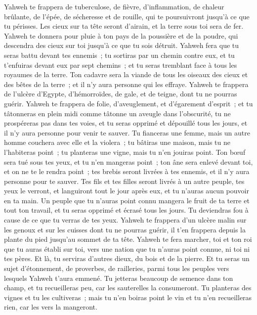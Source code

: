 \begin{multicols}{2}
Yahweh te frappera de tuberculose, de fièvre, d'inflammation, de chaleur brûlante, de l'épée, de sécheresse et de rouille, qui te poursuivront jusqu'à ce que tu périsses.
Les cieux sur ta tête seront d'airain, et la terre sous toi sera de fer.
Yahweh te donnera pour pluie à ton pays de la poussière et de la poudre, qui descendra des cieux sur toi jusqu'à ce que tu sois détruit.
Yahweh fera que tu seras battu devant tes ennemis~; tu sortiras par un chemin contre eux, et tu t'enfuiras devant eux par sept chemins~; et tu seras tremblant face à tous les royaumes de la terre.
Ton cadavre sera la viande de tous les oiseaux des cieux et des bêtes de la terre~; et il n'y aura personne qui les effraye.
Yahweh te frappera de l'ulcère d'Egypte, d'hémorroïdes, de gale, et de teigne, dont tu ne pourras guérir.
Yahweh te frappera de folie, d'aveuglement, et d'égarement d'esprit~;
et tu tâtonneras en plein midi comme tâtonne un aveugle dans l'obscurité, tu ne prospéreras pas dans tes voies, et tu seras opprimé et dépouillé tous les jours, et il n'y aura personne pour venir te sauver.
Tu fianceras une femme, mais un autre homme couchera avec elle et la violera~; tu bâtiras une maison, mais tu ne l'habiteras point~; tu planteras une vigne, mais tu n'en jouiras point.
Ton bœuf sera tué sous tes yeux, et tu n'en mangeras point~; ton âne sera enlevé devant toi, et on ne te le rendra point~; tes brebis seront livrées à tes ennemis, et il n'y aura personne pour te sauver.
Tes fils et tes filles seront livrés à un autre peuple, tes yeux le verront, et languiront tout le jour après eux, et tu n'auras aucun pouvoir en ta main.
Un peuple que tu n'auras point connu mangera le fruit de ta terre et tout ton travail, et tu seras opprimé et écrasé tous les jours.
Tu deviendras fou à cause de ce que tu verras de tes yeux.
Yahweh te frappera d'un ulcère malin sur les genoux et sur les cuisses dont tu ne pourras guérir, il t'en frappera depuis la plante du pied jusqu'au sommet de ta tête.
Yahweh te fera marcher, toi et ton roi que tu auras établi sur toi, vers une nation que tu n'auras point connue, ni toi ni tes pères. Et là, tu serviras d'autres dieux, du bois et de la pierre.
Et tu seras un sujet d'étonnement, de proverbes, de railleries, parmi tous les peuples vers lesquels Yahweh t'aura emmené.
Tu jetteras beaucoup de semence dans ton champ, et tu recueilleras peu, car les sauterelles la consumeront.
Tu planteras des vignes et tu les cultiveras~; mais tu n'en boiras point le vin et tu n'en recueilleras rien, car les vers la mangeront.

\end{multicols}
